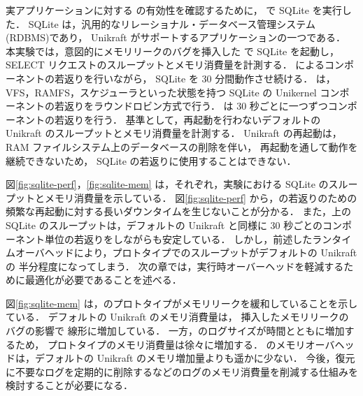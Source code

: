 実アプリケーションに対する \sysname の有効性を確認するために，
\sysname で SQLite を実行した．
SQLite は，汎用的なリレーショナル・データベース管理システム(RDBMS)であり，
Unikraft がサポートするアプリケーションの一つである．
本実験では，意図的にメモリリークのバグを挿入した \sysname で SQLite を起動し，
SELECT リクエストのスループットとメモリ消費量を計測する．
\sysname によるコンポーネントの若返りを行いながら，
SQLite を 30 分間動作させ続ける．
\sysname は，
VFS，RAMFS，スケジューラといった状態を持つ SQLite の Unikernel コンポーネントの若返りをラウンドロビン方式で行う．
\sysname は 30 秒ごとに一つずつコンポーネントの若返りを行う．
基準として，再起動を行わないデフォルトの Unikraft のスループットとメモリ消費量を計測する．
Unikraft の再起動は，RAM ファイルシステム上のデータベースの削除を伴い，
再起動を通して動作を継続できないため，
SQLite の若返りに使用することはできない．

図\ref{fig:sqlite-perf}，\ref{fig:sqlite-mem} は，それぞれ，実験における SQLite のスループットとメモリ消費量を示している．
図\ref{fig:sqlite-perf} から，\sysname の若返りのための頻繁な再起動に対する長いダウンタイムを生じないことが分かる．
また，\sysname 上の SQLite のスループットは，デフォルトの Unikraft と同様に 30 秒ごとのコンポーネント単位の若返りをしながらも安定している．
しかし，前述したランタイムオーバヘッドにより，プロトタイプでのスループットがデフォルトの Unikraft の 半分程度になってしまう．
次の章では，実行時オーバーヘッドを軽減するために最適化が必要であることを述べる．


図\ref{fig:sqlite-mem} は，\sysname のプロトタイプがメモリリークを緩和していることを示している．
デフォルトの Unikraft のメモリ消費量は，
挿入したメモリリークのバグの影響で
線形に増加している．
一方，\sysname のログサイズが時間とともに増加するため，
プロトタイプのメモリ消費量は徐々に増加する．
\sysname のメモリオーバヘッドは，デフォルトの Unikraft のメモリ増加量よりも遥かに少ない．
今後，復元に不要なログを定期的に削除するなどのログのメモリ消費量を削減する仕組みを検討することが必要になる．
